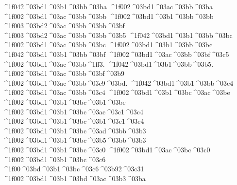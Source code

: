 {^^^^1f042^^^^03bd1^^^^03b1^^^^03bb^^^^03ba 		%
^^^^1f002^^^^03bd1^^^^03ac^^^^03bb^^^^03ba
^^^^1f002^^^^03bd1^^^^03ac^^^^03bb^^^^03bb     		%
^^^^1f002^^^^03bd1^^^^03b1^^^^03bb^^^^03bb
	^^^^1f003^^^^03bd2^^^^03ac^^^^03bb^^^^03bb^^^^03bf 		%
	^^^^1f003^^^^03bd2^^^^03ac^^^^03bb^^^^03bb^^^^03b5
^^^^1f042^^^^03bd1^^^^03b1^^^^03bb^^^^03bc 		%
^^^^1f002^^^^03bd1^^^^03ac^^^^03bb^^^^03bc 		%
^^^^1f002^^^^03bd1^^^^03b1^^^^03bb^^^^03bc
^^^^1f042^^^^03bd1^^^^03b1^^^^03bb^^^^03bf 		%
^^^^1f002^^^^03bd1^^^^03ac^^^^03bb^^^^03bf^^^^03c5
^^^^1f002^^^^03bd1^^^^03ac^^^^03bb^^^^1ff3.
^^^^1f042^^^^03bd1^^^^03b1^^^^03bb^^^^03b5.
^^^^1f002^^^^03bd1^^^^03ac^^^^03bb^^^^03bf^^^^03b9
^^^^1f002^^^^03bd1^^^^03ac^^^^03bb^^^^03c9^^^^03bd.
^^^^1f042^^^^03bd1^^^^03b1^^^^03bb^^^^03c4 		%
^^^^1f002^^^^03bd1^^^^03ac^^^^03bb^^^^03c4
^^^^1f002^^^^03bd1^^^^03b1^^^^03bc^^^^03ac^^^^03be 		%
^^^^1f002^^^^03bd1^^^^03b1^^^^03bc^^^^03b1^^^^03be
^^^^1f002^^^^03bd1^^^^03b1^^^^03bc^^^^03ac^^^^03c1^^^^03c4 		%
^^^^1f002^^^^03bd1^^^^03b1^^^^03bc^^^^03b1^^^^03c1^^^^03c4
^^^^1f002^^^^03bd1^^^^03b1^^^^03bc^^^^03ad^^^^03bb^^^^03b3 		%
^^^^1f002^^^^03bd1^^^^03b1^^^^03bc^^^^03b5^^^^03bb^^^^03b3
^^^^1f002^^^^03bd1^^^^03b1^^^^03bc^^^^03c0 		%
^^^^1f002^^^^03bd1^^^^03ac^^^^03bc^^^^03c0 		%
^^^^1f002^^^^03bd1^^^^03b1^^^^03bc^^^^03c6 		%
^^^^1f00^^^^03bd^^^^03b1^^^^03bc^^^^03c6^^^^03b92^^^^03c31 		%
^^^^1f002^^^^03bd1^^^^03b1^^^^03bd^^^^03ac^^^^03b3^^^^03ba 		%
}
